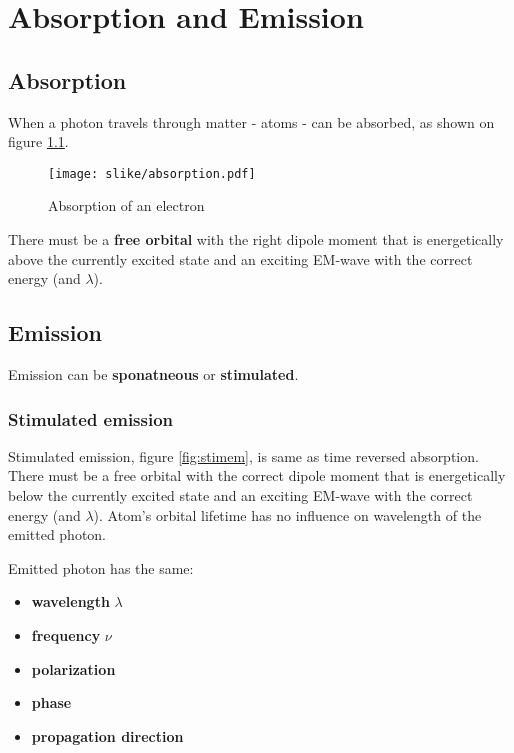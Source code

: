 \chapter{Absorption and Emission}

\section{Absorption}
When a photon travels through matter - atoms - can be absorbed, as shown on figure
\ref{fig:absorption1}.
\begin{figure}[h!]
    \centering
    \texttt{[image: slike/absorption.pdf]}
    \caption{Absorption of an electron}
    \label{fig:absorption1}
\end{figure}

There must be a \textbf{free orbital} with the right dipole moment that is energetically above the currently excited state and an 
exciting EM-wave with the correct energy (and $\lambda$).

\section{Emission}
Emission can be \textbf{sponatneous} or \textbf{stimulated}.




\subsection{Stimulated emission}
Stimulated emission, figure \ref{fig:stimem}, is same as time reversed absorption. There must be a free orbital with the correct dipole moment that is energetically
below the currently excited state and an exciting EM-wave with the correct energy (and $\lambda$).
Atom's orbital lifetime has no influence on wavelength of the emitted photon.

Emitted photon has the same: \begin{itemize}
        \item \textbf{wavelength } $\lambda$
        \item \textbf{frequency} $\nu$
        \item \textbf{polarization}
        \item \textbf{phase}
        \item \textbf{propagation direction}
    \end{itemize}

